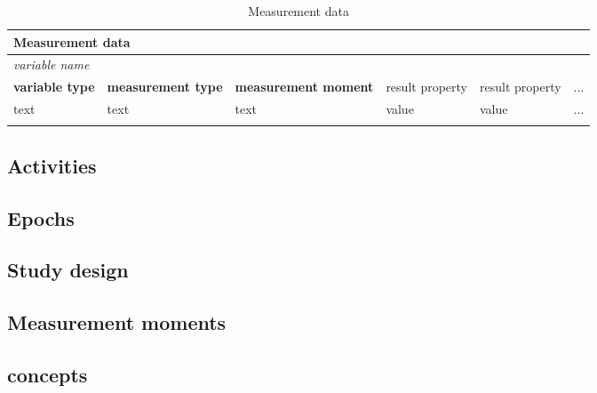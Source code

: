 \documentclass[a4paper,10pt]{article}
\begin{document}
\begin{table}[]
  \caption{Measurement data}
  \begin{tabular}{|l|l|l|l|l|l|}
    \hline
    \multicolumn{6}{|l}{\textbf{Measurement data}}  \\ \hline
    \multicolumn{6}{|l|}{\textit{variable name}}                 \\ \hline
    \textbf{variable type} &\textbf{ measurement type} & \textbf{measurement moment} & result property & result property & ... \\ \hline
    text & text & text & value & value & ...  \\  \cline{4-6} 
         &      &      & & &  \\ \hline
  \end{tabular}
\end{table}

\subsection*{Activities}
\subsection*{Epochs}
\subsection*{Study design}
\subsection*{Measurement moments}
\subsection*{concepts}
\end{document}
